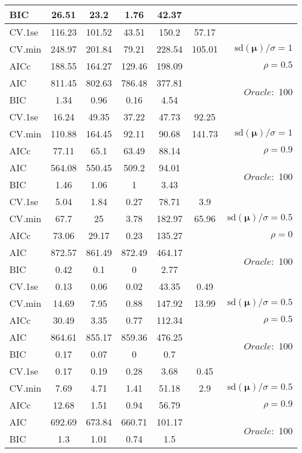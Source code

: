 \begin{table}
\begin{center}
\begin{tabular}{l*{5}{c}|r}
BIC & 26.51 & 23.2 & 1.76 & 42.37 & &  \\
 \hline 
CV.1se & 116.23 & 101.52 & 43.51 & 150.2 & 57.17 & \\
CV.min & 248.97 & 201.84 & 79.21 & 228.54 & 105.01 &  $\mathrm{sd}(\mathbf{\mu})/\sigma=1$ \\
AICc & 188.55 & 164.27 & 129.46 & 198.09 & & $\rho=0.5$ \\
AIC & 811.45 & 802.63 & 786.48 & 377.81 & &  \multirow{2}{*}{$Oracle: $ 100} \\
BIC & 1.34 & 0.96 & 0.16 & 4.54 & &  \\
 \hline 
CV.1se & 16.24 & 49.35 & 37.22 & 47.73 & 92.25 & \\
CV.min & 110.88 & 164.45 & 92.11 & 90.68 & 141.73 &  $\mathrm{sd}(\mathbf{\mu})/\sigma=1$ \\
AICc & 77.11 & 65.1 & 63.49 & 88.14 & & $\rho=0.9$ \\
AIC & 564.08 & 550.45 & 509.2 & 94.01 & &  \multirow{2}{*}{$Oracle: $ 100} \\
BIC & 1.46 & 1.06 & 1 & 3.43 & &  \\
 \hline 
CV.1se & 5.04 & 1.84 & 0.27 & 78.71 & 3.9 & \\
CV.min & 67.7 & 25 & 3.78 & 182.97 & 65.96 &  $\mathrm{sd}(\mathbf{\mu})/\sigma=0.5$ \\
AICc & 73.06 & 29.17 & 0.23 & 135.27 & & $\rho=0$ \\
AIC & 872.57 & 861.49 & 872.49 & 464.17 & &  \multirow{2}{*}{$Oracle: $ 100} \\
BIC & 0.42 & 0.1 & 0 & 2.77 & &  \\
 \hline 
CV.1se & 0.13 & 0.06 & 0.02 & 43.35 & 0.49 & \\
CV.min & 14.69 & 7.95 & 0.88 & 147.92 & 13.99 &  $\mathrm{sd}(\mathbf{\mu})/\sigma=0.5$ \\
AICc & 30.49 & 3.35 & 0.77 & 112.34 & & $\rho=0.5$ \\
AIC & 864.61 & 855.17 & 859.36 & 476.25 & &  \multirow{2}{*}{$Oracle: $ 100} \\
BIC & 0.17 & 0.07 & 0 & 0.7 & &  \\
 \hline 
CV.1se & 0.17 & 0.19 & 0.28 & 3.68 & 0.45 & \\
CV.min & 7.69 & 4.71 & 1.41 & 51.18 & 2.9 &  $\mathrm{sd}(\mathbf{\mu})/\sigma=0.5$ \\
AICc & 12.68 & 1.51 & 0.94 & 56.79 & & $\rho=0.9$ \\
AIC & 692.69 & 673.84 & 660.71 & 101.17 & &  \multirow{2}{*}{$Oracle: $ 100} \\
BIC & 1.3 & 1.01 & 0.74 & 1.5 & &  \\
 \hline 
\end{tabular}
\end{center}
\vspace{-1cm}
\end{table}





